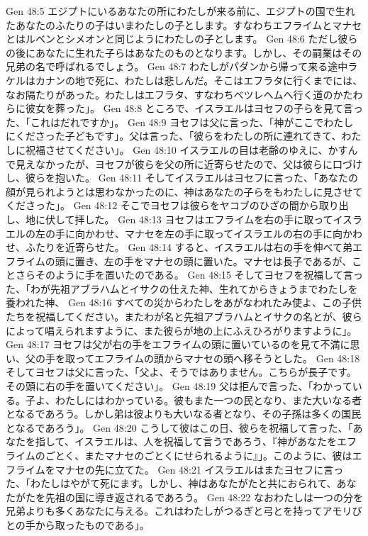 Gen 48:5  エジプトにいるあなたの所にわたしが来る前に、エジプトの国で生れたあなたのふたりの子はいまわたしの子とします。すなわちエフライムとマナセとはルベンとシメオンと同じようにわたしの子とします。
Gen 48:6  ただし彼らの後にあなたに生れた子らはあなたのものとなります。しかし、その嗣業はその兄弟の名で呼ばれるでしょう。
Gen 48:7  わたしがパダンから帰って来る途中ラケルはカナンの地で死に、わたしは悲しんだ。そこはエフラタに行くまでには、なお隔たりがあった。わたしはエフラタ、すなわちベツレヘムへ行く道のかたわらに彼女を葬った」。
Gen 48:8  ところで、イスラエルはヨセフの子らを見て言った、「これはだれですか」。
Gen 48:9  ヨセフは父に言った、「神がここでわたしにくださった子どもです」。父は言った、「彼らをわたしの所に連れてきて、わたしに祝福させてください」。
Gen 48:10  イスラエルの目は老齢のゆえに、かすんで見えなかったが、ヨセフが彼らを父の所に近寄らせたので、父は彼らに口づけし、彼らを抱いた。
Gen 48:11  そしてイスラエルはヨセフに言った、「あなたの顔が見られようとは思わなかったのに、神はあなたの子らをもわたしに見させてくださった」。
Gen 48:12  そこでヨセフは彼らをヤコブのひざの間から取り出し、地に伏して拝した。
Gen 48:13  ヨセフはエフライムを右の手に取ってイスラエルの左の手に向かわせ、マナセを左の手に取ってイスラエルの右の手に向かわせ、ふたりを近寄らせた。
Gen 48:14  すると、イスラエルは右の手を伸べて弟エフライムの頭に置き、左の手をマナセの頭に置いた。マナセは長子であるが、ことさらそのように手を置いたのである。
Gen 48:15  そしてヨセフを祝福して言った、「わが先祖アブラハムとイサクの仕えた神、生れてからきょうまでわたしを養われた神、
Gen 48:16  すべての災からわたしをあがなわれたみ使よ、この子供たちを祝福してください。またわが名と先祖アブラハムとイサクの名とが、彼らによって唱えられますように、また彼らが地の上にふえひろがりますように」。
Gen 48:17  ヨセフは父が右の手をエフライムの頭に置いているのを見て不満に思い、父の手を取ってエフライムの頭からマナセの頭へ移そうとした。
Gen 48:18  そしてヨセフは父に言った、「父よ、そうではありません。こちらが長子です。その頭に右の手を置いてください」。
Gen 48:19  父は拒んで言った、「わかっている。子よ、わたしにはわかっている。彼もまた一つの民となり、また大いなる者となるであろう。しかし弟は彼よりも大いなる者となり、その子孫は多くの国民となるであろう」。
Gen 48:20  こうして彼はこの日、彼らを祝福して言った、「あなたを指して、イスラエルは、人を祝福して言うであろう、『神があなたをエフライムのごとく、またマナセのごとくにせられるように』」。このように、彼はエフライムをマナセの先に立てた。
Gen 48:21  イスラエルはまたヨセフに言った、「わたしはやがて死にます。しかし、神はあなたがたと共におられて、あなたがたを先祖の国に導き返されるであろう。
Gen 48:22  なおわたしは一つの分を兄弟よりも多くあなたに与える。これはわたしがつるぎと弓とを持ってアモリびとの手から取ったものである」。
